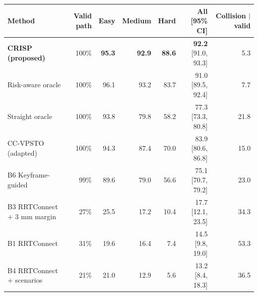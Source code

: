 \begin{tabular}{lrrrrrr}
\toprule
Method & Valid path & Easy & Medium & Hard & All [95\% CI] & Collision $|$ valid \\
\midrule
\textbf{CRISP (proposed)} & 100\% & \textbf{95.3} & \textbf{92.9} & \textbf{88.6} & \textbf{92.2} [91.0, 93.3] & 5.3 \\
Risk-aware oracle & 100\% & 96.1 & 93.2 & 83.7 & 91.0 [89.5, 92.4] & 7.7 \\
Straight oracle & 100\% & 93.8 & 79.8 & 58.2 & 77.3 [73.3, 80.8] & 21.8 \\
CC-VPSTO (adapted) & 100\% & 94.3 & 87.4 & 70.0 & 83.9 [80.6, 86.8] & 15.0 \\
B6 Keyframe-guided & 99\% & 89.6 & 79.0 & 56.6 & 75.1 [70.7, 79.2] & 23.0 \\
B3 RRTConnect + 3 mm margin & 27\% & 25.5 & 17.2 & 10.4 & 17.7 [12.1, 23.5] & 34.3 \\
B1 RRTConnect & 31\% & 19.6 & 16.4 & 7.4 & 14.5 [9.8, 19.0] & 53.3 \\
B4 RRTConnect + scenarios & 21\% & 21.0 & 12.9 & 5.6 & 13.2 [8.4, 18.3] & 36.5 \\
\bottomrule
\end{tabular}
